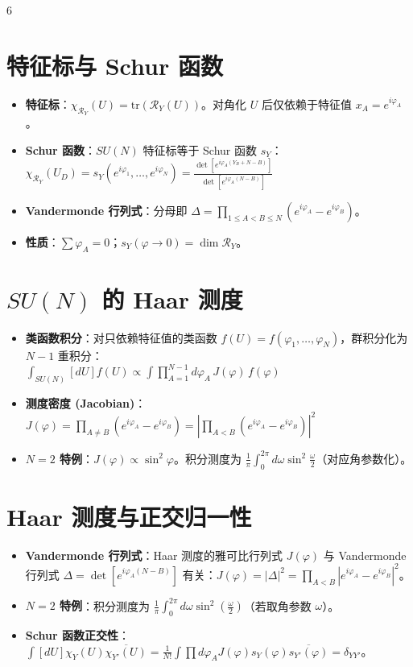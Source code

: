 \documentclass[landscape]{article}
\begin{document}
\begin{multicols*}{6}
\section*{特征标与 Schur 函数}
\begin{itemize}
  \item \textbf{特征标}：$\chi_{\mathcal{R}_Y}(U) = \mathrm{tr}(\mathcal{R}_Y(U))$。对角化 $U$ 后仅依赖于特征值 $x_A = e^{i\varphi_A}$。
  \item \textbf{Schur 函数}：$SU(N)$ 特征标等于 Schur 函数 $s_Y$：
  \\
  $
  \chi_{\mathcal{R}_Y}(U_D) = s_Y(e^{i\varphi_1}, \dots, e^{i\varphi_N}) = \frac{\det[e^{i\varphi_A(Y_B + N - B)}]}{\det[e^{i\varphi_A(N - B)}]}
  $
  \item \textbf{Vandermonde 行列式}：分母即 $\Delta = \prod_{1\le A<B \le N} (e^{i\varphi_A} - e^{i\varphi_B})$。
  \item \textbf{性质}：$\sum \varphi_A = 0$；$s_Y(\varphi \to 0) = \dim \mathcal{R}_Y$。
\end{itemize}

\section*{$SU(N)$ 的 Haar 测度}
\begin{itemize}
  \item \textbf{类函数积分}：对只依赖特征值的类函数 $f(U)=f(\varphi_1,\dots,\varphi_N)$，群积分化为 $N-1$ 重积分：
  \\
  $
  \int_{SU(N)} [dU]f(U) \propto \int \prod_{A=1}^{N-1} d\varphi_A \, J(\varphi) \, f(\varphi)
  $
  \item \textbf{测度密度 (Jacobian)}：
  \\
  $
  J(\varphi) = \prod_{A \neq B} (e^{i\varphi_A} - e^{i\varphi_B}) = \left| \prod_{A<B} (e^{i\varphi_A} - e^{i\varphi_B}) \right|^2
  $
  \item \textbf{$N=2$ 特例}：$J(\varphi) \propto \sin^2 \varphi$。积分测度为 $\frac{1}{\pi}\int_0^{2\pi} d\omega \sin^2 \frac{\omega}{2}$（对应角参数化）。
\end{itemize}
\section*{Haar 测度与正交归一性}
\begin{itemize}
  \item \textbf{Vandermonde 行列式}：Haar 测度的雅可比行列式 $J(\varphi)$ 与 Vandermonde 行列式 $\Delta = \det[e^{i\varphi_A(N-B)}]$ 有关：$J(\varphi) = |\Delta|^2 = \prod_{A<B} |e^{i\varphi_A} - e^{i\varphi_B}|^2$。
  \item \textbf{$N=2$ 特例}：积分测度为 $\frac{1}{\pi} \int_0^{2\pi} d\omega \sin^2(\frac{\omega}{2})$（若取角参数 $\omega$）。
  \item \textbf{Schur 函数正交性}：$\int [dU] \chi_Y(U) \overline{\chi_{Y'}(U)} = \frac{1}{N!} \int \prod d\varphi_A J(\varphi) s_Y(\varphi) \overline{s_{Y'}(\varphi)} = \delta_{YY'}$。
\end{itemize}


\end{multicols*}
\end{document}

